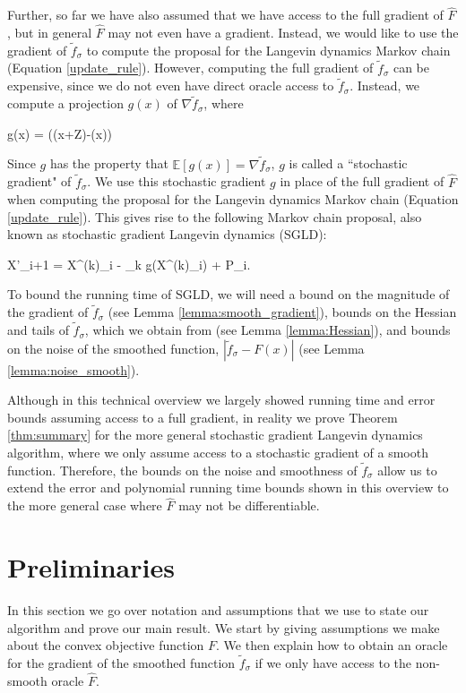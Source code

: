 \documentclass[final,12pt]{colt2018} %
\def \be{\begin{equs}}
\def \ee{\end{equs}}
\begin{document}
{Further, so far we have also assumed that we have access to the full gradient of $\hat{F}$, but in general $\hat{F}$ may not even have a gradient.  
%
Instead, we would like to use the gradient of $\tilde{f}_\sigma$ to compute the proposal for the Langevin dynamics Markov chain (Equation \eqref{update_rule}).  
%
However, computing the full gradient of $\tilde{f}_\sigma$ can be expensive, since we do not even have direct oracle access to $\tilde{f}_{\sigma}$.  
%
Instead, we compute a projection $g(x)$ of $\nabla \tilde{f}_\sigma$, where
\be
g(x) = ((x+Z)-(x))
\ee
Since $g$ has the property that $\mathbb{E}[g(x)] = \nabla \tilde{f}_\sigma$, $g$ is called a ``stochastic gradient" of $\tilde{f}_\sigma$. 
%
 We use this stochastic gradient $g$ in place of the full gradient of $\hat{F}$ when computing the proposal for the Langevin dynamics Markov chain (Equation \ref{update_rule}).  
 This gives rise to the following Markov chain proposal, also known as stochastic gradient Langevin dynamics (SGLD):
\be
X'_{i+1} = X^{(k)}_i - \eta_k g(X^{(k)}_i) +  P_i.
\ee
To bound the running time of SGLD, we will need a bound on the magnitude of the gradient of $\tilde{f}_\sigma$ (see Lemma \ref{lemma:smooth_gradient}), bounds on the Hessian and tails of $\tilde{f}_\sigma$, which we obtain from \cite{hitting_times} (see Lemma \ref{lemma:Hessian}), and bounds on the noise of the smoothed function, $|\tilde{f}_\sigma - F(x)|$ (see Lemma \ref{lemma:noise_smooth}). 

Although in this technical overview we largely showed running time and error bounds assuming access to a full gradient, in reality we prove Theorem \ref{thm:summary} for the more general stochastic gradient Langevin dynamics algorithm, where we only assume access to a stochastic gradient of a smooth function.  
%
Therefore, the bounds on the noise and smoothness of $\tilde{f}_\sigma$ allow us to extend the error and polynomial running time bounds shown in this overview to the more general case where $\hat{F}$ may not be differentiable.

\newpage

 


\newpage 
\appendix

\section{Preliminaries}\label{sec:preliminaries}

In this section we go over notation and assumptions that we use to state our algorithm and  prove our main result.  
%
We start by giving assumptions we make about the convex objective function $F$.  
%
We then explain how to obtain an oracle for the gradient of the smoothed function $\tilde{f}_\sigma$ if we only have access to the non-smooth oracle $\hat{F}$.

}
\end{document}

